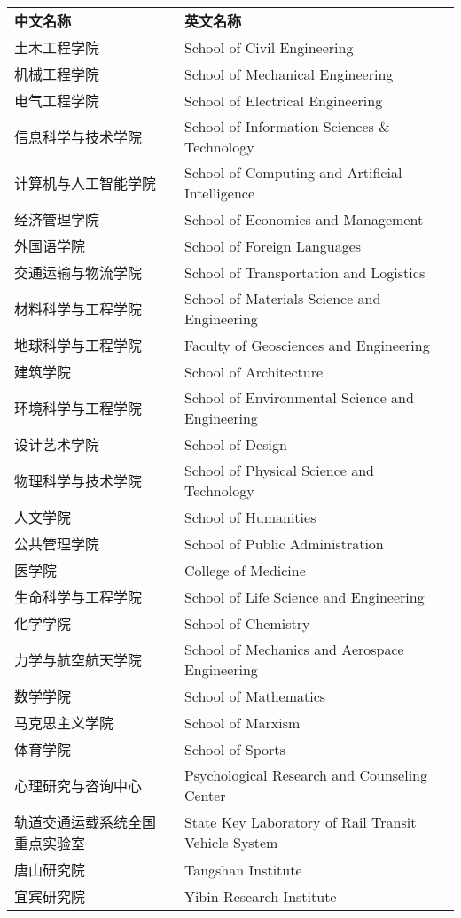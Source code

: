 \begin{table}[!ht]
\centering
\begin{tabular}{ll}
\label{tabA-1}
\textbf{中文名称} & \textbf{英文名称}  \\
土木工程学院	& School of Civil Engineering \\
机械工程学院	& School of Mechanical Engineering \\
电气工程学院	& School of Electrical Engineering \\
信息科学与技术学院 & School of Information Sciences \& Technology \\
计算机与人工智能学院 & School of Computing and Artificial Intelligence \\
经济管理学院	& School of Economics and Management \\
外国语学院 & School of Foreign Languages \\
交通运输与物流学院 & School of Transportation and Logistics \\
材料科学与工程学院 & School of Materials Science and Engineering \\
地球科学与工程学院 & Faculty of Geosciences and Engineering \\
建筑学院	& School of Architecture \\
环境科学与工程学院 & School of Environmental Science and Engineering \\
设计艺术学院	& School of Design \\
物理科学与技术学院 & School of Physical Science and Technology \\
人文学院	& School of Humanities \\
公共管理学院	& School of Public Administration \\
医学院 & College of Medicine \\
生命科学与工程学院 & School of Life Science and Engineering \\
化学学院	& School of Chemistry \\
力学与航空航天学院 & School of Mechanics and Aerospace Engineering \\
数学学院	& School of Mathematics \\
马克思主义学院 & School of Marxism \\
体育学院	& School of Sports \\
心理研究与咨询中心 & Psychological Research and Counseling Center \\
轨道交通运载系统全国重点实验室	& State Key Laboratory of Rail Transit Vehicle System \\
唐山研究院 & Tangshan Institute \\
宜宾研究院 & Yibin Research Institute \\
\end{tabular}
\end{table}